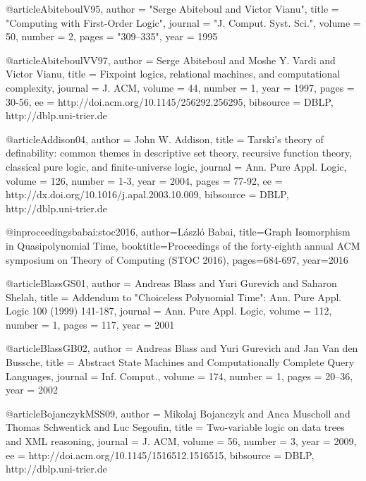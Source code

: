 \documentclass{article}
\begin{document}
@article{AbiteboulV95,
  author      = "Serge Abiteboul and Victor Vianu",
  title       = "Computing with First-Order Logic",
  journal     = "J. Comput. Syst. Sci.",
  volume      = 50,
  number      = 2,
  pages       = "309--335",
  year        = 1995
}

@article{AbiteboulVV97,
  author    = {Serge Abiteboul and
               Moshe Y. Vardi and
               Victor Vianu},
  title     = {Fixpoint logics, relational machines, and computational
               complexity},
  journal   = {J. ACM},
  volume    = {44},
  number    = {1},
  year      = {1997},
  pages     = {30-56},
  ee        = {http://doi.acm.org/10.1145/256292.256295},
  bibsource = {DBLP, http://dblp.uni-trier.de}
}

@article{Addison04,
  author    = {John W. Addison},
  title     = {Tarski's theory of definability: common themes in descriptive
               set theory, recursive function theory, classical pure logic,
               and finite-universe logic},
  journal   = {Ann. Pure Appl. Logic},
  volume    = {126},
  number    = {1-3},
  year      = {2004},
  pages     = {77-92},
  ee        = {http://dx.doi.org/10.1016/j.apal.2003.10.009},
  bibsource = {DBLP, http://dblp.uni-trier.de}
}

@inproceedings{babai:stoc2016,
author={L\'{a}szl\'{o} Babai},
title={Graph Isomorphism in Quasipolynomial Time},
booktitle={Proceedings of the forty-eighth annual ACM symposium on Theory of Computing (STOC 2016)},
pages={684-697},
year=2016}

@article{BlassGS01,
  author    = {Andreas Blass and
               Yuri Gurevich and
               Saharon Shelah},
  title     = {Addendum to "Choiceless Polynomial Time": Ann. Pure Appl. Logic 100
               {(1999)} 141-187},
  journal   = {Ann. Pure Appl. Logic},
  volume    = {112},
  number    = {1},
  pages     = {117},
  year      = {2001}
}

@article{BlassGB02,
  author    = {Andreas Blass and
               Yuri Gurevich and
               Jan {Van den Bussche}},
  title     = {Abstract State Machines and Computationally Complete Query Languages},
  journal   = {Inf. Comput.},
  volume    = {174},
  number    = {1},
  pages     = {20--36},
  year      = {2002}
}

@article{BojanczykMSS09,
  author    = {Mikolaj Bojanczyk and
               Anca Muscholl and
               Thomas Schwentick and
               Luc Segoufin},
  title     = {Two-variable logic on data trees and {XML} reasoning},
  journal   = {J. ACM},
  volume    = {56},
  number    = {3},
  year      = {2009},
  ee        = {http://doi.acm.org/10.1145/1516512.1516515},
  bibsource = {DBLP, http://dblp.uni-trier.de}
}
\end{document}
